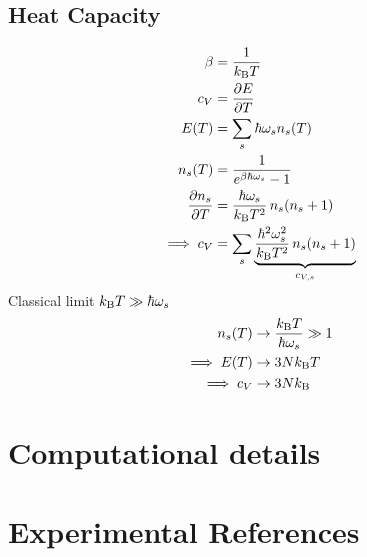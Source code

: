 \section{Heat Capacity}
\begin{subequations}
\begin{align}
	\beta
		& = \frac{1}{k_{\rm B} T} \\
	c_V 
		&= \frac{\partial E}{\partial T} \\
	E (T)
		&= \sum_s \hbar \omega_s n_s (T) \\
	n_s (T)
		&= \frac{1}{e^{\beta \hbar \omega_s} - 1} \\
	\frac{\partial n_s}{\partial T}
		&= \frac{\hbar \omega_s}{k_{\rm B} T^2} \, n_s (n_s + 1) \\
	\implies c_V
		&= \sum_s \underset{c_{V, s}}{\underbrace{\frac{\hbar^2 \omega_s^2}{k_{\rm B} T^2} \, n_s (n_s + 1)}}
\end{align}
\end{subequations}
Classical limit $k_{\rm B} T \gg \hbar \omega_s$
\begin{subequations}
\begin{align}
	n_s (T) 
		&\to \frac{k_{\rm B} T}{\hbar \omega_s} \gg 1 \\
	\implies E(T)
		&\to 3 N k_{\rm B} T \\
	\implies c_V 
		&\to 3 N k_{\rm B}
\end{align}
\end{subequations}

\chapter{Computational details}
\label{sec:app.computational_details}

\chapter{Experimental References}
\label{sec:app.experiments}

